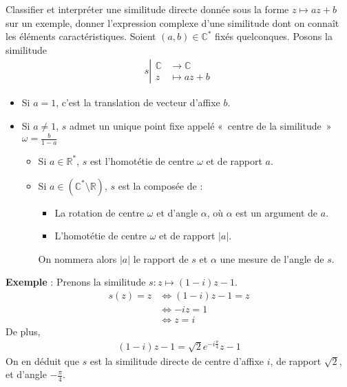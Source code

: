 \documentclass{article}
\begin{document}
\begin{question_kholle}{Classifier et interpréter une similitude directe donnée sous la forme $z \mapsto a z + b$ sur un exemple, donner l'expression complexe d'une similitude dont on connaît les éléments caractéristiques.}
  Soient $(a, b) \in \mathbb{C}^*$ fixés quelconques. Posons la similitude
  \begin{align*}
    s \left| \begin{array}{ll}
               \mathbb{C} & \to \mathbb{C}  \\
               z          & \mapsto a z + b
             \end{array}\right.
  \end{align*}
  \begin{itemize}[label=$\lozenge$]
    \item Si $a = 1$, c'est la translation de vecteur d'affixe $b$.
    \item Si $a \neq 1$, $s$ admet un unique point fixe appelé «~centre de la similitude~» $\omega = \frac{b}{1-a}$
          \begin{itemize}[label=$\star$]
            \item Si $a \in \mathbb{R}^*$, $s$ est l'homotétie de centre $\omega$ et de rapport $a$.
            \item Si $a \in (\mathbb{C}^* \setminus \mathbb{R})$, $s$ est la composée de :
                  \begin{itemize}
                    \item La rotation de centre $\omega$ et d'angle $\alpha$, où $\alpha$ est un argument de $a$.
                    \item L'homotétie de centre $\omega$ et de rapport $|a|$.
                  \end{itemize}
                  On nommera alors $|a|$ le rapport de $s$ et $\alpha$ une mesure de l'angle de $s$.
          \end{itemize}
  \end{itemize}
  \textbf{Exemple} : Prenons la similitude $s: z \mapsto (1 - i) z - 1$.
  \begin{align*}
    s(z) = z & \iff (1 - i)z - 1 = z \\
             & \iff -iz = 1          \\
             & \iff z = i
  \end{align*}
  De plus,
  \begin{align*}
    (1 - i)z - 1 = \sqrt{2}e^{-i \frac{\pi}{4}}z - 1
  \end{align*}
  On en déduit que $s$ est la similitude directe de centre d'affixe $i$, de rapport $\sqrt{2}$, et d'angle $-\frac{\pi}{4}$.
\end{question_kholle}
\end{document}

